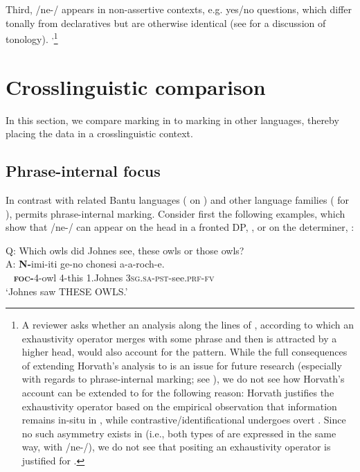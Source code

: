 \documentclass[output=paper,modfonts]{langscibook}
\begin{document}
{  Third, /ne-/ appears in non-assertive contexts, e.g. yes/no questions, which differ tonally from declaratives but are otherwise identical (see \citealt{Mwita2008} for a discussion of  tonology).  
}\textsuperscript{,}\footnote{A reviewer 
  asks whether an analysis along the lines of \citet{Horvath2007}, according to which an exhaustivity operator merges with some phrase and then is attracted by a higher head, would also account for the  pattern. While the full consequences of extending Horvath's analysis to  is an issue for future research (especially with regards to phrase-internal  marking; see ), we do not see how Horvath's account can be extended to  for the following reason: Horvath justifies the exhaustivity operator based on the empirical observation that information  remains in-situ in , while contrastive/identificational  undergoes overt . Since no such asymmetry exists in  (i.e., both types of  are expressed in the same way, with /ne-/), we do not see that positing an exhaustivity operator is justified for .}


 
\section{Crosslinguistic comparison}\label{sec:landman:5}


In this section, we compare  marking in  to  marking in other languages, thereby placing the  data in a crosslinguistic context.

 
\subsection{Phrase-internal focus}\label{sec:landman:5.1}



In contrast with related Bantu languages (\citealt{AbelsMuriungi2008} on ) and other language families (\citealt{HartmannZimmermann2009} for ),  permits phrase-internal  marking. Consider first the following examples, which show that /ne-/ can appear on the head  in a fronted DP, , or on the determiner, :


 
\ea\label{ex:landmann:30}
   Q: Which owls did Johnes see, these owls or those owls?\\
\gll A: \textbf{N-}imi-iti ge-no chonesi a-a-roch-e.\\
     ~ \textsc{\textbf{foc-}}4-owl 4-this 1.Johnes \textsc{3sg}.\textsc{sa}-\textsc{pst}-see.\textsc{prf}-\textsc{fv}\\
\glt ‘Johnes saw THESE OWLS.’
\z
\end{document}
